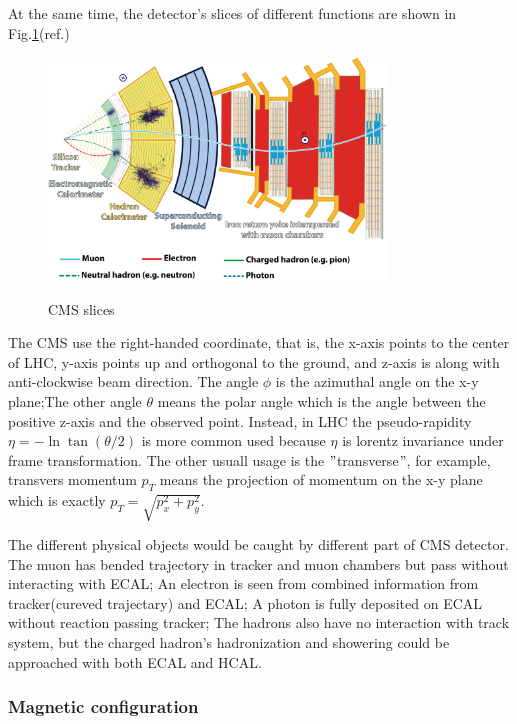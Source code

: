 		At the same time, the detector's slices of different functions are shown in Fig.\ref{ExpApp:fig:CMS_slices}(ref.\cite{Barney:2120661})

		\begin{figure}[H]
		\centering{}
	    	\includegraphics[width=0.8\textwidth]{Figures/ExpApparatus/CMSslice_whiteBackground.png}\\
		\caption{CMS slices\cite{Barney:2120661}}
		\label{ExpApp:fig:CMS_slices}
		\end{figure}
		\FloatBarrier

		The CMS use the right-handed coordinate, that is, the x-axis points to the center of LHC, y-axis points up and orthogonal to the ground, and z-axis is along with anti-clockwise beam direction. The angle $\phi$ is the azimuthal angle on the x-y plane;The other angle $\theta$ means the polar angle which is the angle between the positive z-axis and the observed point. Instead, in LHC the pseudo-rapidity $\eta = -\ln{\tan{(\theta/2)}}$ is more common used because $\eta$ is lorentz invariance under frame transformation. The other usuall usage is the $"$transverse$"$, for example, transvers momentum $p_T$ means the projection of momentum on the x-y plane which is exactly $p_T = \sqrt{p_x^2 + p_y^2}$.

		The different physical objects would be caught by different part of CMS detector. The muon has bended trajectory in tracker and muon chambers but pass without interacting with ECAL; An electron is seen from combined information from tracker(cureved trajectary) and ECAL; A photon is fully deposited on ECAL without reaction passing tracker; The hadrons also have no interaction with track system, but the charged hadron's hadronization and showering could be approached with both ECAL and HCAL.

		\subsubsection{Magnetic configuration}
		\label{sssec:ExpApp_magnetic}


